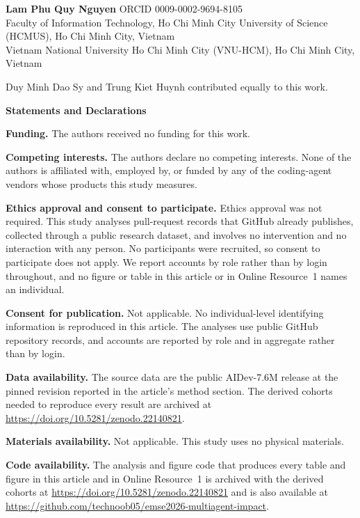 \documentclass[11pt,a4paper]{article}
\begin{document}
\textbf{Lam Phu Quy Nguyen} \quad ORCID 0009-0002-9694-8105\\
Faculty of Information Technology, Ho Chi Minh City University of Science
(HCMUS), Ho Chi Minh City, Vietnam\\
Vietnam National University Ho Chi Minh City (VNU-HCM), Ho Chi Minh City,
Vietnam

\vspace{1em}

Duy Minh Dao Sy and Trung Kiet Huynh contributed equally to this work.

\vspace{1.5em}

\textbf{\large Statements and Declarations}

\textbf{Funding.} The authors received no funding for this work.

\textbf{Competing interests.} The authors declare no competing interests. None
of the authors is affiliated with, employed by, or funded by any of the
coding-agent vendors whose products this study measures.

\textbf{Ethics approval and consent to participate.} Ethics approval was not
required. This study analyses pull-request records that GitHub already
publishes, collected through a public research dataset, and involves no
intervention and no interaction with any person. No participants were recruited,
so consent to participate does not apply. We report accounts by role rather than
by login throughout, and no figure or table in this article or in Online
Resource~1 names an individual.

\textbf{Consent for publication.} Not applicable. No individual-level
identifying information is reproduced in this article. The analyses use public
GitHub repository records, and accounts are reported by role and in aggregate
rather than by login.

\textbf{Data availability.} The source data are the public AIDev-7.6M release at
the pinned revision reported in the article's method section. The derived
cohorts needed to reproduce every result are archived at
\url{https://doi.org/10.5281/zenodo.22140821}.

\textbf{Materials availability.} Not applicable. This study uses no physical
materials.

\textbf{Code availability.} The analysis and figure code that produces every
table and figure in this article and in Online Resource~1 is archived with the
derived cohorts at
\url{https://doi.org/10.5281/zenodo.22140821}
and is also available at
\url{https://github.com/technoob05/emse2026-multiagent-impact}.
\end{document}
